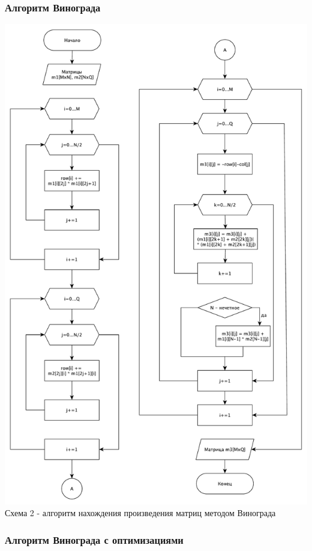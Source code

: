 \documentclass[a4paper,14pt]{article} %
\begin{document}
        \subsubsection{Алгоритм Винограда}
        
        \begin{center}
        		\includegraphics[scale = 0.53]{shema2} \\ Схема  2 - алгоритм нахождения произведения матриц методом Винограда
	\end{center}
	
	\subsubsection{Алгоритм Винограда с оптимизациями}
	
\end{document}
